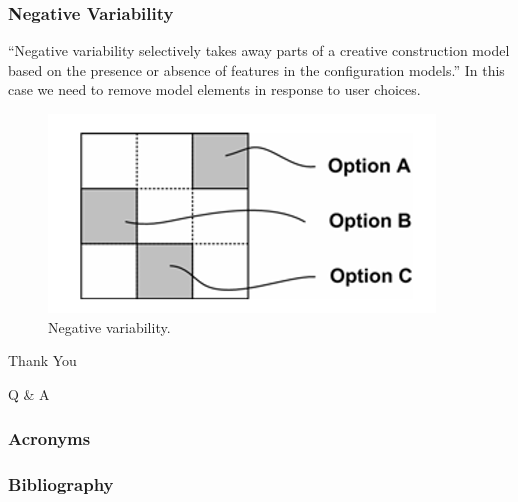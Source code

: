 \documentclass{beamer}
\begin{document}
\begin{frame}
\frametitle{Negative Variability}

``Negative variability selectively takes away parts of a creative
construction model based on the presence or absence of features in the
configuration models.''\cite{groher2007expressing} In this case we
need to remove model elements in response to user choices.

\pause

\begin{figure}
  \centering
  \includegraphics[scale=0.5]{images/negative_variability_voelter.png}
  \caption{Negative variability.\cite{groher2007expressing}}
\end{figure}

\end{frame}

\begin{frame}

\begin{center}
  \huge{Thank You}
\end{center}

\end{frame}

\begin{frame}

\begin{center}
    \huge{Q \& A}
\end{center}

\end{frame}

\begin{frame}
\frametitle{Acronyms}

\begin{acronym}
\end{acronym}

\end{frame}

\begin{frame}
\frametitle{Bibliography}

\printbibliography

\end{frame}
\end{document}

